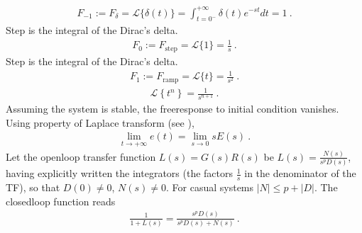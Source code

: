 \documentclass[letterpaper,10pt,english]{jupyterBook}
\begin{document}
\sphinxAtStartPar
{}
\begin{equation*}
\begin{split}F_{-1} := F_{\delta} = \mathscr{L} \{ \delta(t) \} = \int_{t = 0^-}^{+\infty} \delta(t) e^{-st} dt  = 1 \ . \end{split}
\end{equation*}
\sphinxAtStartPar
{} Step is the integral of the Dirac’s delta.
\begin{equation*}
\begin{split}F_0 := F_{\text{step}} = \mathscr{L} \{ 1 \} = \frac{1}{s} \ .\end{split}
\end{equation*}
\sphinxAtStartPar
{} Step is the integral of the Dirac’s delta.
\begin{equation*}
\begin{split}F_1 := F_{\text{ramp}} = \mathscr{L} \{ t \} = \frac{1}{s^2} \ .\end{split}
\end{equation*}
\sphinxAtStartPar
{}
\begin{equation*}
\begin{split}\mathscr{L} \left\{ t^n \right\} = \frac{1}{s^{n+1}} \ .\end{split}
\end{equation*}
\sphinxAtStartPar
{}
Assuming the system is stable, the free\sphinxhyphen{}response to initial condition vanishes. Using  property of Laplace transform (see {\hyperref[\detokenize{ch/complex/laplace-def-thm:complex-laplace-def-thm}]{}}),
\begin{equation*}
\begin{split}\lim_{t \rightarrow + \infty} e(t) = \lim_{s \rightarrow 0} s E(s) \ .\end{split}
\end{equation*}
\sphinxAtStartPar
Let the open\sphinxhyphen{}loop transfer function \(L(s) = G(s) R(s)\) be \(L(s) = \frac{N(s)}{s^p D(s)}\), having explicitly written the integrators (the factors \(\frac{1}{s}\) in the denominator of the TF), so that \(D(0) \ne 0\), \(N(s) \ne 0\). For casual systems \(|N| \le p + |D|\). The closed\sphinxhyphen{}loop function reads
\begin{equation*}
\begin{split}\frac{1}{1 + L(s)} = \frac{s^p D(s)}{ s^p D(s) + N(s) } \ .\end{split}
\end{equation*}
\end{document}
